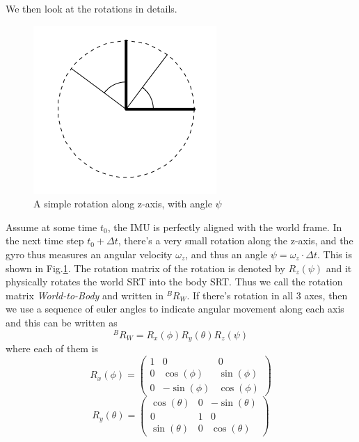 \documentclass[twoside]{article}
\begin{document}
\begin{multicols}{2}
We then look at the rotations in details.
\begin{figure}[H]
\centering
\includegraphics[width=0.5\columnwidth]{fig/rot.png} 
\caption{A simple rotation along z-axis, with angle $\psi$}
\label{fig:rotz}
\end{figure}
Assume at some time $t_0$, the IMU is perfectly aligned with the world frame. In the next time step $t_0+\Delta t$, there's a very small rotation along the z-axis, and the gyro thus measures an angular velocity $\omega_z$, and thus an angle $\psi = \omega_z \cdot \Delta t$. This is shown in Fig.\ref{fig:rotz}. The rotation matrix of the rotation is denoted by $R_z(\psi)$ and it physically rotates the world SRT into the body SRT. Thus we call the rotation matrix \textit{World-to-Body} and written in $^BR_W$. If there's rotation in all 3 axes, then we use a sequence of euler angles to indicate angular movement along each axis and this can be written as
\begin{equation}
^BR_W = R_x(\phi)R_y(\theta)R_z(\psi)
\end{equation}
where each of them is
\begin{equation}
R_x(\phi) = \left(\begin{array}{ccc} 1 & 0 & 0\\ 0 & \cos\!\left(\phi{}\right) & \sin\!\left(\phi{}\right)\\ 0 & - \sin\!\left(\phi{}\right) & \cos\!\left(\phi{}\right) \end{array}\right)
\end{equation}
\begin{equation}
R_y(\theta) = \left(\begin{array}{ccc} \cos\!\left(\theta{}\right) & 0 & - \sin\!\left(\theta{}\right)\\ 0 & 1 & 0\\ \sin\!\left(\theta{}\right) & 0 & \cos\!\left(\theta{}\right) \end{array}\right)

\end{equation}
\end{multicols}
\end{document}
